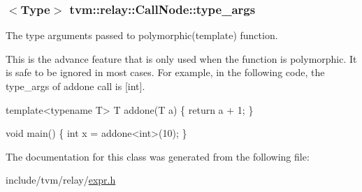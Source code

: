 \subsubsection[{\texorpdfstring{type\+\_\+args}{type_args}}]{$<${\bf Type}$>$ tvm\+::relay\+::\+Call\+Node\+::type\+\_\+args}\hypertarget{classtvm_1_1relay_1_1CallNode_ad23d97a6ae1cc1bea903d4c714f811d6}{}\label{classtvm_1_1relay_1_1CallNode_ad23d97a6ae1cc1bea903d4c714f811d6}


The type arguments passed to polymorphic(template) function. 

This is the advance feature that is only used when the function is polymorphic. It is safe to be ignored in most cases. For example, in the following code, the type\+\_\+args of addone call is \mbox{[}int\mbox{]}.


\begin{DoxyCode}
\textcolor{keyword}{template}<\textcolor{keyword}{typename} T>
T addone(T a) \{ \textcolor{keywordflow}{return} a + 1; \}

\textcolor{keywordtype}{void} main() \{
  \textcolor{keywordtype}{int} x = addone<int>(10);
\}
\end{DoxyCode}
 

The documentation for this class was generated from the following file\+:\begin{DoxyCompactItemize}
\item 
include/tvm/relay/\hyperlink{relay_2expr_8h}{expr.\+h}\end{DoxyCompactItemize}
